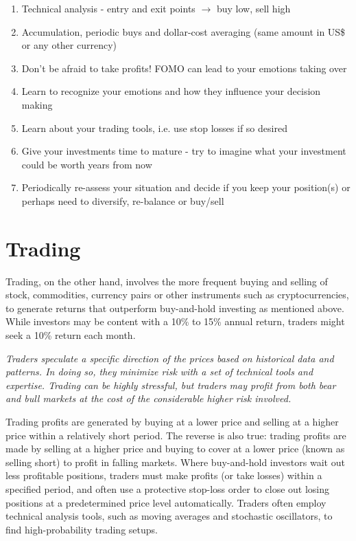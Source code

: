 \begin{enumerate}
    \setlength\itemsep{0em}
    \item Technical analysis - entry and exit points $\longrightarrow$ buy low, sell high %
    \item Accumulation, periodic buys and dollar-cost averaging (same amount in US\$ or any other currency)
    \item Don't be afraid to take profits! FOMO can lead to your emotions taking over
    \item Learn to recognize your emotions and how they influence your decision making
    \item Learn about your trading tools, i.e. use stop losses if so desired
    \item Give your investments time to mature - try to imagine what your investment could be worth years from now
    \item Periodically re-assess your situation and decide if you keep your position(s) or perhaps need to diversify, re-balance or buy/sell
\end{enumerate}

\section{Trading}
Trading, on the other hand, involves the more frequent buying and selling of stock, commodities, currency pairs or other instruments such as cryptocurrencies, to generate returns that outperform buy-and-hold investing as mentioned above. While investors may be content with a 10\% to 15\% annual return, traders might seek a 10\% return each month.\medskip

    \medskip
    \begin{tcolorbox}
    [enhanced,
    title=Traders,
    frame style=
    {left color=orange!85!black,right color=yellow!95!black}]
        \textit{Traders speculate a specific direction of the prices based on historical data and patterns. In doing so, they minimize risk with a set of technical tools and expertise. Trading can be highly stressful, but traders may profit from both bear and bull markets at the cost of the considerable higher risk involved.}
    \end{tcolorbox}
    \medskip

Trading profits are generated by buying at a lower price and selling at a higher price within a relatively short period. The reverse is also true: trading profits are made by selling at a higher price and buying to cover at a lower price (known as selling short) to profit in falling markets. Where buy-and-hold investors wait out less profitable positions, traders must make profits (or take losses) within a specified period, and often use a protective stop-loss order to close out losing positions at a predetermined price level automatically. Traders often employ technical analysis tools, such as moving averages and stochastic oscillators, to find high-probability trading setups.

